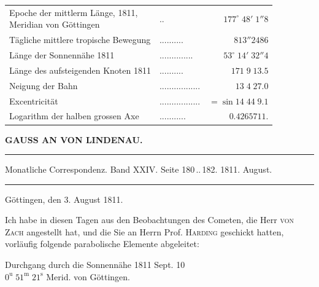 \begin{center}\fontsize{10}{12}\selectfont\setlength{\tabcolsep}{4pt}\renewcommand{\arraystretch}{1.15}\begin{tabular}{llr}
\shortstack[l]{Epoche der mittlerm Länge, 1811,\\Meridian von Göttingen} & .\;. & $177^\circ\;48'\;1''8$\\
Tägliche mittlere tropische Bewegung & .\;.\;.\;.\;.\;.\;.\;.\;.\;. & $813''2486$\\
Länge der Sonnennähe 1811 & .\;.\;.\;.\;.\;.\;.\;.\;.\;.\;.\;.\;.\;. & $53^\circ\;14'\;32''4$\\
Länge des aufsteigenden Knoten 1811 & .\;.\;.\;.\;.\;.\;.\;.\;.\;. & $171\;9\;13.5$\\
Neigung der Bahn & .\;.\;.\;.\;.\;.\;.\;.\;.\;.\;.\;.\;.\;.\;.\;.\;. & $13\;4\;27.0$\\
Excentricität & .\;.\;.\;.\;.\;.\;.\;.\;.\;.\;.\;.\;.\;.\;.\;.\;. & $=\sin14\;44\;9.1$\\
Logarithm der halben grossen Axe & .\;.\;.\;.\;.\;.\;.\;.\;.\;.\;. & $0.4265711.$\\
\end{tabular}\end{center}
\clearpage{}\hypertarget{native-331-lower}{}\label{native-331-lower}
\begin{center}\textbf{GAUSS AN VON LINDENAU.}\par\vspace{4pt}\hrule\vspace{4pt}\fontsize{10}{12}\selectfont Monatliche Correspondenz. Band XXIV. Seite 180\,..\,182. 1811. August.\par\vspace{4pt}\hrule\vspace{4pt}\end{center}

\begin{flushright}Göttingen, den 3. August 1811.\end{flushright}
\par\indent Ich habe in diesen Tagen aus den Beobachtungen des Cometen, die Herr \textsc{von Zach} angestellt hat, und die Sie an Herrn Prof. \textsc{Harding} geschickt hatten, vorläufig folgende parabolische Elemente abgeleitet:
\begin{center}\fontsize{10}{12}\selectfont Durchgang durch die Sonnennähe 1811 Sept. 10\\$0^{\text{u}}\;51^{\text{m}}\;21^{\text{s}}$ Merid. von Göttingen.\end{center}

